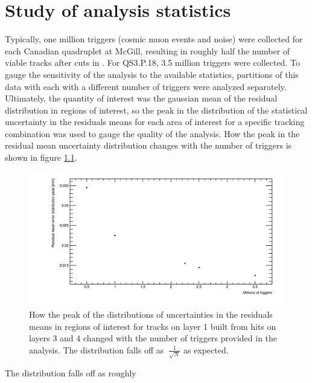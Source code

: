 
\chapter[Analysis statistics]{Study of analysis statistics}
\label{appendix:statistics}


Typically, one million triggers (cosmic muon events and noise) were collected for each Canadian quadruplet at McGill, resulting in roughly half the number of viable tracks after cuts in . For QS3.P.18, 3.5 million triggers were collected. To gauge the sensitivity of the analysis to the available statistics, partitions of this data with each with a different number of triggers were analyzed separately. Ultimately, the quantity of interest was the gaussian mean of the residual distribution in regions of interest, so the peak in the distribution of the statistical uncertainty in the residuals means for each area of interest for a specific tracking combination was used to gauge the quality of the analysis. How the peak in the residual mean uncertainty distribution changes with the number of triggers is shown in figure \ref{fig:res_mean_uncert_vs_triggers}. 

\begin{figure}
    \centering
    \includegraphics[width = \textwidth]{figures/figure_QS3P18_2900V_peakOfMeanErrorsDistVsTriggers_layer1_fixedlayers34_resize_33_percent.png}
    \caption{How the peak of the distributions of uncertainties in the residuals means in regions of interest for tracks on layer 1 built from hits on layers 3 and 4 changed with the number of triggers provided in the analysis. The distribution falls off as $~\frac{1}{\sqrt{N}}$ as expected.}
    \label{fig:res_mean_uncert_vs_triggers}
\end{figure}

The distribution falls off as roughly  